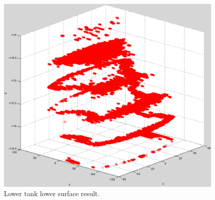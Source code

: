 \begin{figure}[htb]
  \hfill
  \begin{minipage}[b]{4.5in}
    \centering
    \centerline{\mbox{\includegraphics[width=4.5in]{data_extraction/images/MRI/surface4.eps}}}
  \end{minipage}
  \hfill
  \caption{Lower tank lower surface result.}
  \label{fig:surface_result}
\end{figure}



